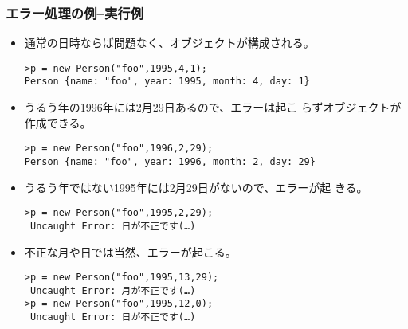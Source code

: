\begin{frame}[containsverbatim]
 \frametitle{エラー処理の例--実行例}
\begin{itemize}
 \item 通常の日時ならば問題なく、オブジェクトが構成される。
\begin{Verbatim}
>p = new Person("foo",1995,4,1);
Person {name: "foo", year: 1995, month: 4, day: 1}
\end{Verbatim}
 \item うるう年の1996年には2月29日あるので、エラーは起こ
			 らずオブジェクトが作成できる。
\begin{Verbatim}
>p = new Person("foo",1996,2,29);
Person {name: "foo", year: 1996, month: 2, day: 29}
\end{Verbatim}
 \item うるう年ではない1995年には2月29日がないので、エラーが起
			 きる。
\begin{Verbatim}
>p = new Person("foo",1995,2,29);
 Uncaught Error: 日が不正です(…)
\end{Verbatim}
 \item 不正な月や日では当然、エラーが起こる。
\begin{Verbatim}
>p = new Person("foo",1995,13,29);
 Uncaught Error: 月が不正です(…)
>p = new Person("foo",1995,12,0);
 Uncaught Error: 日が不正です(…)
\end{Verbatim}
\end{itemize}
\end{frame}

